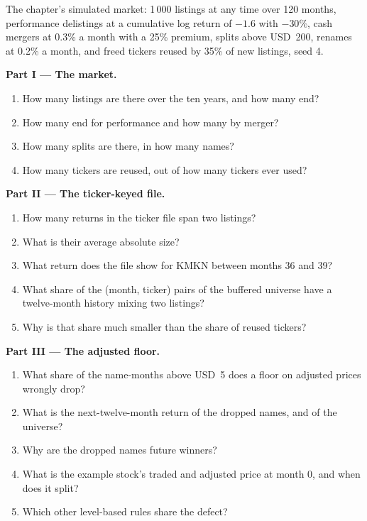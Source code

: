 \begin{problem}\label{pb:rs:universe-symbology-and-corporate-actions:1}
The chapter's simulated market: 1\,000 listings at any time over 120 months, performance delistings at a cumulative log return
of $-1.6$ with $-30\%$, cash mergers at 0.3\% a month with a 25\% premium, splits above USD~200, renames at 0.2\% a month, and
freed tickers reused by 35\% of new listings, seed 4.

\medskip\noindent\textbf{Part I --- The market.}
\begin{enumerate}
\item How many listings are there over the ten years, and how many end?
\item How many end for performance and how many by merger?
\item How many splits are there, in how many names?
\item How many tickers are reused, out of how many tickers ever used?
\end{enumerate}

\medskip\noindent\textbf{Part II --- The ticker-keyed file.}
\begin{enumerate}[resume]
\item How many returns in the ticker file span two listings?
\item What is their average absolute size?
\item What return does the file show for KMKN between months 36 and 39?
\item What share of the (month, ticker) pairs of the buffered universe have a twelve-month history mixing two listings?
\item Why is that share much smaller than the share of reused tickers?
\end{enumerate}

\medskip\noindent\textbf{Part III --- The adjusted floor.}
\begin{enumerate}[resume]
\item What share of the name-months above USD~5 does a floor on adjusted prices wrongly drop?
\item What is the next-twelve-month return of the dropped names, and of the universe?
\item Why are the dropped names future winners?
\item What is the example stock's traded and adjusted price at month 0, and when does it split?
\item Which other level-based rules share the defect?
\end{enumerate}


\end{problem}
